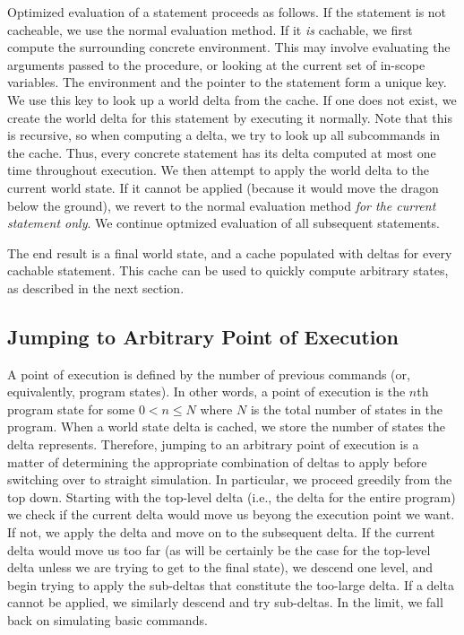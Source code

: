 \documentclass{sig-alternate}
\begin{document}
Optimized evaluation of a statement proceeds as follows. If the statement is not cacheable, we use the normal evaluation method. If it \emph{is} cachable, we first compute the surrounding concrete environment. This may involve evaluating the arguments passed to the procedure, or looking at the current set of in-scope variables. The environment and the pointer to the statement form a unique key. We use this key to look up a world delta from the cache. If one does not exist, we create the world delta for this statement by executing it normally. Note that this is recursive, so when computing a delta, we try to look up all subcommands in the cache. Thus, every concrete statement has its delta computed at most one time throughout execution. We then attempt to apply the world delta to the current world state. If it cannot be applied (because it would move the dragon below the ground), we revert to the normal evaluation method \emph{for the current statement only}. We continue optmized evaluation of all subsequent statements. 

The end result is a final world state, and a cache populated with deltas for every cachable statement. This cache can be used to quickly compute arbitrary states, as described in the next section.

\subsection{Jumping to Arbitrary Point of Execution}

A point of execution is defined by the number of previous commands (or, equivalently, program states). In other words, a point of execution is the $n$th program state for some $0<n\le N$ where $N$ is the total number of states in the program. When a world state delta is cached, we store the number of states the delta represents. Therefore, jumping to an arbitrary point of execution is a matter of determining the appropriate combination of deltas to apply before switching over to straight simulation. In particular, we proceed greedily from the top down. Starting with the top-level delta (i.e., the delta for the entire program) we check if the current delta would move us beyong the execution point we want. If not, we apply the delta and move on to the subsequent delta. If the current delta would move us too far (as will be certainly be the case for the top-level delta unless we are trying to get to the final state), we descend one level, and begin trying to apply the sub-deltas that constitute the too-large delta. If a delta cannot be applied, we similarly descend and try sub-deltas. In the limit, we fall back on simulating basic commands. 
\end{document}
